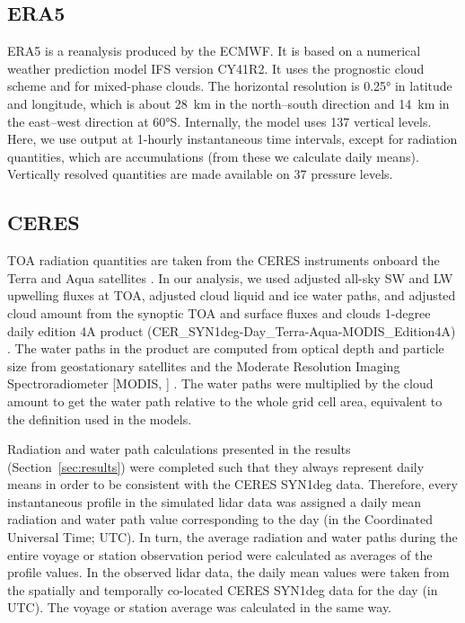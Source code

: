 \documentclass[draft]{agujournal2019}
\begin{document}
\subsection{ERA5}

ERA5 \cite{era5} is a reanalysis produced by the ECMWF. It is based on a numerical weather prediction model IFS version CY41R2. It uses the  prognostic cloud scheme and  for mixed-phase clouds. The horizontal resolution is 0.25° in latitude and longitude, which is about 28~km in the north--south direction and 14~km in the east--west direction at 60°S. Internally, the model uses 137 vertical levels. Here, we use output at 1-hourly instantaneous time intervals, except for radiation quantities, which are accumulations (from these we calculate daily means). Vertically resolved quantities are made available on 37 pressure levels.

\subsection{CERES}
\label{sec:ceres}

TOA radiation quantities are taken from the CERES instruments onboard the Terra and Aqua satellites \cite{wielicki1996,loeb2018}. In our analysis, we used adjusted all-sky SW and LW upwelling fluxes at TOA, adjusted cloud liquid and ice water paths, and adjusted cloud amount from the synoptic TOA and surface fluxes and clouds 1-degree daily edition 4A product (CER\_SYN1deg-Day\_Terra-Aqua-MODIS\_Edition4A) \cite{doelling2013,doelling2016}. The water paths in the product are computed from optical depth and particle size from geostationary satellites and the Moderate Resolution Imaging Spectroradiometer [MODIS, ] \cite{ceres2025}. The water paths were multiplied by the cloud amount to get the water path relative to the whole grid cell area, equivalent to the definition used in the models.

Radiation and water path calculations presented in the results (Section~\ref{sec:results}) were completed such that they always represent daily means in order to be consistent with the CERES SYN1deg data. Therefore, every instantaneous profile in the simulated lidar data was assigned a daily mean radiation and water path value corresponding to the day (in the Coordinated Universal Time; UTC). In turn, the average radiation and water paths during the entire voyage or station observation period were calculated as averages of the profile values. In the observed lidar data, the daily mean values were taken from the spatially and temporally co-located CERES SYN1deg data for the day (in UTC). The voyage or station average was calculated in the same way.
\end{document}
